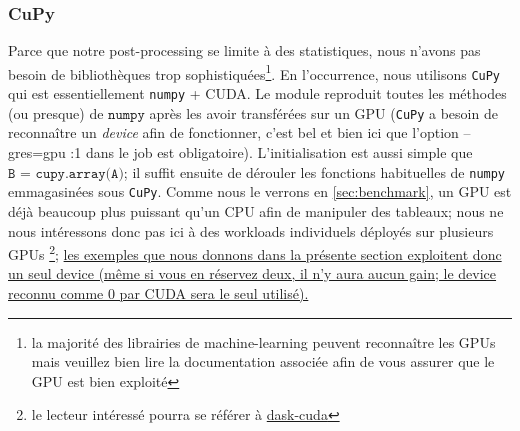 \documentclass[13pt, a4paper]{extarticle}
\begin{document}
\subsubsection{CuPy}\label{sec:cupy}
\noindent Parce que notre post-processing se limite à des statistiques, nous n'avons
pas besoin de bibliothèques trop sophistiquées\footnote{la majorité des librairies 
de machine-learning peuvent reconnaître les GPUs mais veuillez bien lire la documentation
associée afin de vous assurer que le GPU est bien exploité}. En l'occurrence, nous utilisons
\texttt{CuPy} qui est essentiellement \texttt{numpy} + CUDA. Le module reproduit
toutes les méthodes (ou presque) de $\texttt{numpy}$ après les avoir transférées sur un
GPU (\texttt{CuPy} a besoin de reconnaître un \emph{device} afin de fonctionner,
c'est bel et bien ici que l'option --gres=gpu :1 dans le job est obligatoire). L'initialisation
est aussi simple que $\texttt{B = cupy.array(A)}$; il suffit ensuite
de dérouler les fonctions habituelles de \texttt{numpy} emmagasinées sous 
\texttt{CuPy}. Comme nous le verrons en \ref{sec:benchmark},
un GPU est déjà beaucoup plus puissant qu'un CPU afin de manipuler des tableaux;
nous ne nous intéressons donc pas ici à des workloads individuels déployés sur plusieurs GPUs
\footnote{le lecteur intéressé pourra se référer à \href{https://docs.rapids.ai/api/dask-cuda/nightly/}{dask-cuda}};
\ul{les exemples que nous donnons dans la pr\'esente section exploitent donc
un seul device (m\^eme si vous en r\'eservez deux, il n'y aura aucun gain; le device
reconnu comme 0 par CUDA sera le seul utilis\'e).}\\
\end{document}
